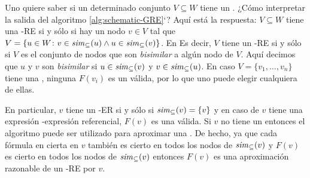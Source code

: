 %

\iffullversion Uno quiere saber si un determinado conjunto  $V\subseteq W$
tiene un \posre. ¿C\'omo interpretar la salida del algoritmo
\ref{alg:schematic-GRE}`? Aqu\'i est\'a la respuesta: $V\subseteq W$ tiene una
\EL-RE si y s\'olo si hay un nodo $v\in V$ tal que  $V=\{u\in W\colon
v\in{\it sim}_\subseteq(u) \wedge u\in{\it sim}_\subseteq(v)\}$. En
Es decir, $V$ tiene un \EL-RE si y s\'olo si $V$ es el conjunto de nodos que son
\emph{bisimilar} a alg\'un nodo de $V$. Aqu\'i decimos que $u$ y $v$
son \emph{bisimilar} si $u\in{\it sim}_\subseteq(v)$ y
$v\in{\it sim}_\subseteq(u)$. En caso  $V=\{v_1,\dots,v_n\}$ tiene una
\posre, ninguna $F(v_i)$ es un \posre v\'alida, por lo que uno puede elegir cualquiera de ellas.

%

En particular, $v$ tiene un \EL-ER si y s\'olo si ${\it sim}_\subseteq(v)=\{v\}$
y en caso de $v$ tiene una expresi\'on \EL-expresi\'on referencial, $F(v)$ es una v\'alida. Si $v$ no tiene un \posre entonces el algoritmo puede ser
utilizado para aproximar una \posre. De hecho, ya que cada f\'ormula en cierta en $v$
tambi\'en es cierto en todos los nodos de ${\it sim}_\subseteq(v)$ y $F(v)$
es cierto en todos los nodos de ${\it sim}_\subseteq(v)$ entonces $F(v)$ es una
aproximaci\'on razonable de un \EL-RE por $v$.

